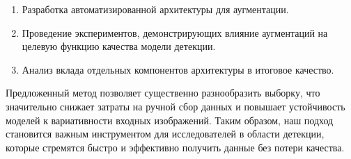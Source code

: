 \begin{enumerate}
    \item Разработка автоматизированной архитектуры для аугментации.
    \item Проведение экспериментов, демонстрирующих влияние аугментаций на целевую функцию качества модели детекции.
    \item Анализ вклада отдельных компонентов архитектуры в итоговое качество.
\end{enumerate}

Предложенный метод позволяет существенно разнообразить выборку, что значительно снижает затраты на ручной сбор данных и повышает устойчивость моделей к вариативности входных изображений. Таким образом, наш подход становится важным инструментом для исследователей в области детекции, которые стремятся быстро и эффективно получить данные без потери качества.